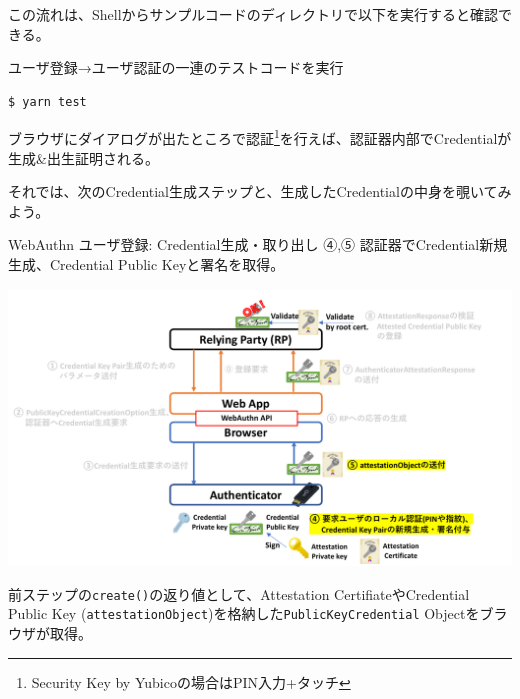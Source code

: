 \documentclass[12pt,dvipdfmx,uplatex]{beamer}
\begin{document}
\begin{frame}[fragile]
この流れは、Shellからサンプルコードのディレクトリで以下を実行すると確認できる。
\begin{exampleblock}{\footnotesize ユーザ登録→ユーザ認証の一連のテストコードを実行}
{\footnotesize
\begin{verbatim}
$ yarn test
\end{verbatim}
}
\end{exampleblock}

\vspace{2ex}
ブラウザにダイアログが出たところで認証\footnote[frame]{\scriptsize Security Key by Yubicoの場合はPIN入力+タッチ}を行えば、\alert{認証器内部でCredentialが生成\&出生証明される。}

\vspace{2ex}
それでは、次のCredential生成ステップと、生成したCredentialの中身を覗いてみよう。
\end{frame}

\begin{frame}{WebAuthn ユーザ登録: Credential生成・取り出し}
\small
④,⑤ 認証器でCredential新規生成、Credential Public Keyと署名を取得。
\begin{center}
 \includegraphics[width=0.9\linewidth]{Figs/webauthn-registration3.pdf}
\end{center}
前ステップの\texttt{create()}の返り値として、Attestation CertifiateやCredential Public Key (\texttt{attestationObject})を格納した\texttt{PublicKeyCredential} Objectをブラウザが取得。
\end{frame}
\end{document}
